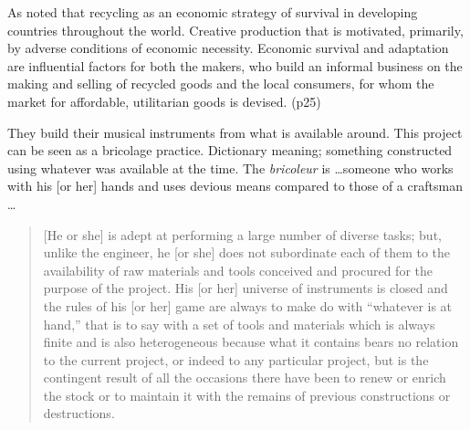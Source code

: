 As noted that recycling as an economic strategy of survival in developing countries throughout the world. Creative production that is motivated, primarily, by adverse conditions of economic necessity. Economic survival and adaptation are influential factors for both the makers, who build an informal business on the making and selling of recycled goods and the local consumers, for whom the market for affordable, utilitarian goods is devised. (p25)

They build their musical instruments from what is available around. This project can be seen as a bricolage practice. Dictionary meaning; something constructed using whatever was available at the time.  The \textit{bricoleur} is \ldots someone who works with his [or her] hands and uses devious means compared to those of a craftsman \ldots \cite{levi1966savage} 


\begin{quote}
[He or she] is adept at performing a large number of diverse tasks; but, unlike the engineer, he [or she] does not subordinate each of them to the availability of raw materials and tools conceived and procured for the purpose of the project. His [or her] universe of instruments is closed and the rules of his [or her] game are always to make do with “whatever is at hand,” that is to say with a set of tools and materials which is always finite and is also heterogeneous because what it contains bears no relation to the current project, or indeed to any particular project, but is the contingent result of all the occasions there have been to renew or enrich the stock or to maintain it with the remains of previous constructions or destructions.\cite{levi1966savage}
\end{quote}

